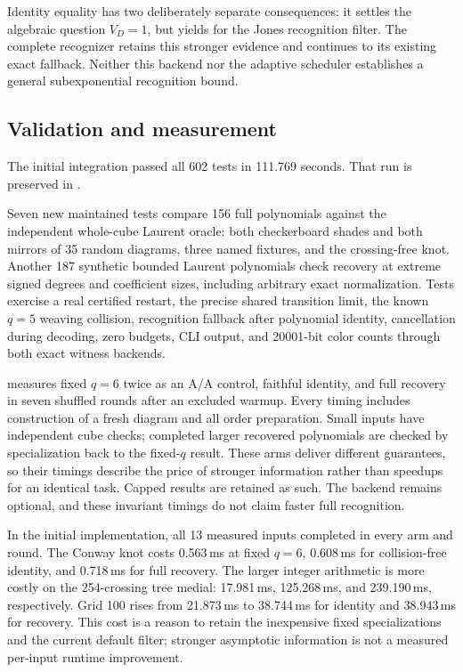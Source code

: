Identity equality has two deliberately separate consequences: it settles
the algebraic question $V_D=1$, but yields  for the Jones
recognition filter.  The complete recognizer retains this stronger evidence
and continues to its existing exact fallback.  Neither this backend nor the
adaptive scheduler establishes a general subexponential recognition bound.

\subsection{Validation and measurement}

The initial integration passed all 602 tests in 111.769 seconds.
That run is preserved in .

Seven new maintained tests compare 156 full polynomials against the independent
whole-cube Laurent oracle: both checkerboard shades and both mirrors of 35
random diagrams, three named fixtures, and the crossing-free knot.  Another
187 synthetic bounded Laurent polynomials check recovery at extreme signed
degrees and coefficient sizes, including arbitrary exact normalization.
Tests exercise a real certified restart, the precise shared transition limit,
the known $q=5$ weaving collision, recognition fallback after polynomial
identity, cancellation during decoding, zero budgets, CLI output, and
20001-bit color counts through both exact witness backends.

 measures fixed $q=6$ twice as an A/A
control, faithful identity, and full recovery in seven shuffled rounds after
an excluded warmup.  Every timing includes construction of a fresh diagram
and all order preparation.  Small inputs have independent cube checks;
completed larger recovered polynomials are checked by specialization back
to the fixed-$q$ result.  These arms deliver different guarantees, so their
timings describe the price of stronger information rather than speedups for
an identical task.  Capped results are retained as such.  The backend remains
optional, and these invariant timings do not claim faster full recognition.



In the initial implementation, all 13 measured inputs completed in every
arm and round.  The Conway knot
costs 0.563\,ms at fixed $q=6$, 0.608\,ms for collision-free identity, and
0.718\,ms for full recovery.  The larger integer arithmetic is more costly
on the 254-crossing tree medial: 17.981\,ms, 125.268\,ms, and 239.190\,ms,
respectively.  Grid 100 rises from 21.873\,ms to 38.744\,ms for identity
and 38.943\,ms for recovery.  This cost is a reason to retain the inexpensive
fixed specializations and the current default filter; stronger asymptotic
information is not a measured per-input runtime improvement.

